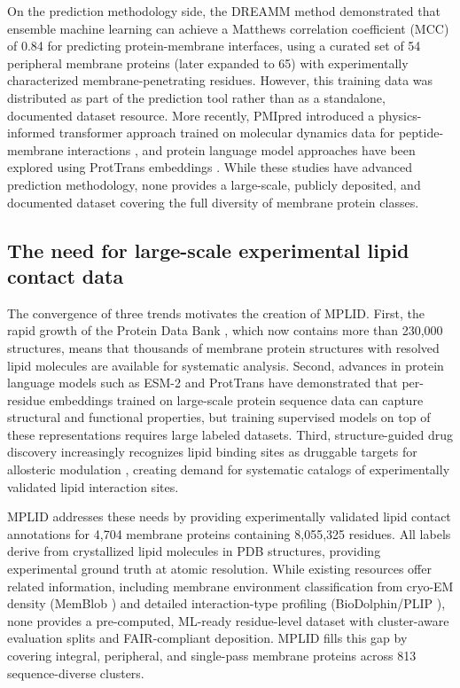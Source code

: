 \documentclass[unnumsec,webpdf,contemporary,large]{oup-authoring-template}
\begin{document}
On the prediction methodology side, the DREAMM method \cite{chatzigoulas2022} demonstrated that ensemble machine learning can achieve a Matthews correlation coefficient (MCC) of 0.84 for predicting protein-membrane interfaces, using a curated set of 54 peripheral membrane proteins (later expanded to 65) with experimentally characterized membrane-penetrating residues. However, this training data was distributed as part of the prediction tool rather than as a standalone, documented dataset resource. More recently, PMIpred introduced a physics-informed transformer approach trained on molecular dynamics data for peptide-membrane interactions \cite{vanhilten2024}, and protein language model approaches have been explored using ProtTrans embeddings \cite{paranou2024, elnaggar2022}. While these studies have advanced prediction methodology, none provides a large-scale, publicly deposited, and documented dataset covering the full diversity of membrane protein classes.

\subsection{The need for large-scale experimental lipid contact data}

The convergence of three trends motivates the creation of MPLID. First, the rapid growth of the Protein Data Bank \cite{berman2000, burley2023}, which now contains more than 230,000 structures, means that thousands of membrane protein structures with resolved lipid molecules are available for systematic analysis. Second, advances in protein language models such as ESM-2 \cite{lin2023} and ProtTrans \cite{elnaggar2022} have demonstrated that per-residue embeddings trained on large-scale protein sequence data can capture structural and functional properties, but training supervised models on top of these representations requires large labeled datasets. Third, structure-guided drug discovery increasingly recognizes lipid binding sites as druggable targets for allosteric modulation \cite{chatzigoulas2022server, duncan2020}, creating demand for systematic catalogs of experimentally validated lipid interaction sites.

MPLID addresses these needs by providing experimentally validated lipid contact annotations for 4,704 membrane proteins containing 8,055,325 residues. All labels derive from crystallized lipid molecules in PDB structures, providing experimental ground truth at atomic resolution. While existing resources offer related information, including membrane environment classification from cryo-EM density (MemBlob \cite{memblob2019}) and detailed interaction-type profiling (BioDolphin/PLIP \cite{biodolphin2024, plip2021}), none provides a pre-computed, ML-ready residue-level dataset with cluster-aware evaluation splits and FAIR-compliant deposition. MPLID fills this gap by covering integral, peripheral, and single-pass membrane proteins across 813 sequence-diverse clusters.
\end{document}
